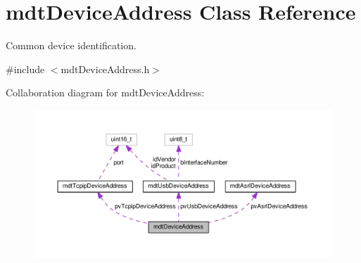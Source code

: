 \hypertarget{classmdt_device_address}{\section{mdt\-Device\-Address Class Reference}
\label{classmdt_device_address}
}


Common device identification.  




{\ttfamily \#include $<$mdt\-Device\-Address.\-h$>$}



Collaboration diagram for mdt\-Device\-Address\-:\nopagebreak
\begin{figure}[H]
\begin{center}
\leavevmode
\includegraphics[width=350pt]{classmdt_device_address__coll__graph}
\end{center}
\end{figure}

